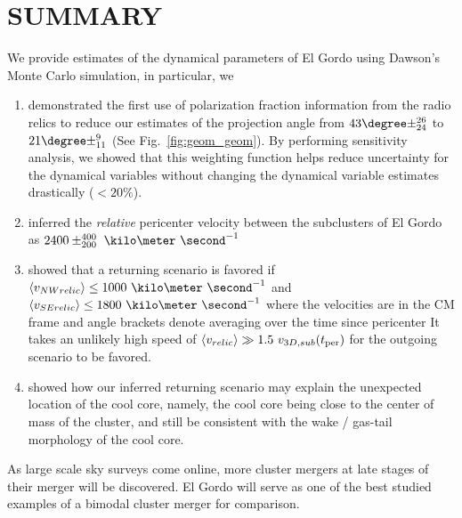 \documentclass[letterpaper,useAMS,usenatbib]{mn2e}
\begin{document}
\section{SUMMARY} 
We provide estimates of the dynamical parameters of El Gordo using Dawson's
Monte Carlo simulation, in particular, we 
\begin{enumerate}
	\item demonstrated the first use of polarization fraction information from
		the radio relics to reduce our estimates of the projection angle from
		$43\degree \pm ^{26}_{24}$ to $21 \degree \pm^{9}_{11}$ (See
		Fig.~\ref{fig:geom_geom}). By performing sensitivity analysis, we
		showed that this weighting function helps reduce uncertainty for the dynamical
		variables without changing the dynamical variable estimates drastically ($< 20\%$).\\ 
	\item inferred the {\it relative} pericenter velocity 
		between the subclusters of El Gordo as 
		$2400\pm^{400}_{200}~\kilo\meter~\second^{-1}$ \\ 
	\item showed that a returning scenario is favored if $\langle v_{NW relic}\rangle \leq
		1000~\kilo
		\meter~\second^{-1}$ and $\langle v_{SE relic}\rangle \leq
		1800~\kilo\meter~\second^{-1}$
where the velocities are in the CM frame and angle brackets denote averaging over the time since pericenter
		It takes
		an unlikely high speed of $\langle v_{relic} \rangle \gg 1.5~v_{3D,
		sub}(t_{\rm per})$ for the outgoing scenario to be favored. \\ 
	\item showed how our inferred
		returning scenario may explain the unexpected location of the cool
		core, namely, the cool core being close to the center of mass of the
		cluster, and still be consistent with the wake / gas-tail morphology of the cool core. 
\end{enumerate}
As large scale sky surveys come online, more cluster mergers at late
stages of their merger will be discovered. El Gordo will serve as one of
the best studied examples of a bimodal cluster merger for comparison.  
\end{document}
